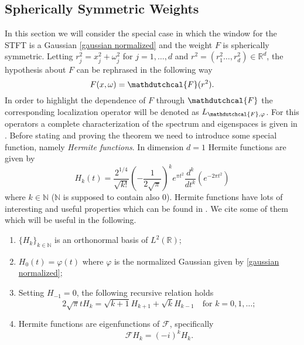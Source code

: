 \documentclass[corpo=11pt, stile=classica, tipotesi=custom,
greek, evenboxes, english]{toptesi}
\numberwithin{equation}{chapter}
\newcommand{\R}{\mathbb{R}} %
\newcommand{\N}{\mathbb{N}} %
\newcommand{\F}{\mathscr{F}} %
\begin{document}
\subsection{Spherically Symmetric Weights}
In this section we will consider the special case in which the window for the STFT is a Gaussian \eqref{gaussian normalized} and the weight $F$ is spherically symmetric. Letting $r_j^2 = x_j^2 + \omega_j^2$ for $j=1,\ldots,d$ and $r^2=(r_1^2\ldots,r_d^2) \in \R^d$, the hypothesis about $F$ can be rephrased in the following way
\begin{equation}\label{sperically symmetric weight}
	F(x,\omega) = \mathdutchcal{F}(r^2).
\end{equation}
{\color{blue} In order to highlight the dependence of $F$ through $\mathdutchcal{F}$ the corresponding localization operator will be denoted as $L_{\mathdutchcal{F},\varphi}$}.
For this operators a complete characterization of the spectrum and eigenspaces is given in \cite{daubechies}. Before stating and proving the theorem we need to introduce some special function, namely \emph{Hermite functions}. In dimension $d=1$ Hermite functions are given by
\begin{equation}\label{Hermite function 1-dimensional}
	H_k(t) = \dfrac{2^{1/4}}{\sqrt{k!}}\left(-\dfrac{1}{2\sqrt{\pi}}\right)^k e^{\pi t^2} \dfrac{d^k}{dt^k}\left(e^{-2\pi t^2}\right)
\end{equation}
where $k \in \N$ ($\N$ is supposed to contain also 0). Hermite functions have lots of interesting and useful properties which can be found in \cite[][Section 1.7]{folland_harmonic}. We cite some of them which will be useful in the following.
\begin{enumerate}[label=(\roman*)]
	\item $\{H_k\}_{k \in \N}$ is an orthonormal basis of $L^2(\R)$;
	\item $H_0(t) = \varphi(t)$ where $\varphi$ is the normalized Gaussian given by \eqref{gaussian normalized};
	\item Setting $H_{-1} = 0$, the following recursive relation holds
	\begin{equation}\label{Hermite functions recursion}
		2\sqrt{\pi}t H_k = \sqrt{k+1}H_{k+1} + \sqrt{k}H_{k-1} \quad \text{for } k=0,1,\ldots;
	\end{equation}
	\item Hermite functions are eigenfunctions of $\F$, specifically
	\begin{equation}\label{Hermite functions are eigenfunctions of Fourier transform}
		\F H_k =(-i)^k H_k.
	\end{equation}
\end{enumerate}
\end{document}

